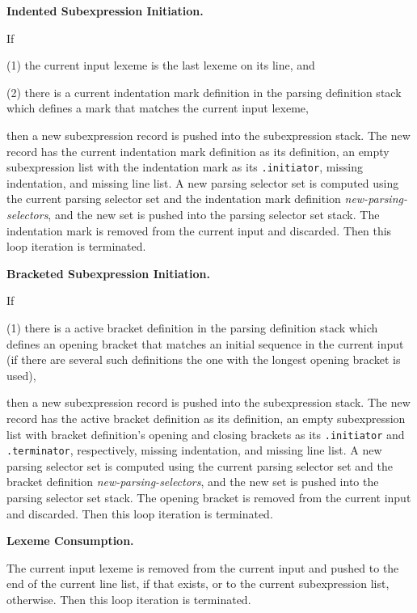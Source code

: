 \documentclass[12pt]{article}
\newenvironment{indpar}[1][0.3in]%
	{\begin{list}{}%
		     {\setlength{\itemsep}{0in}%
		      \setlength{\topsep}{0in}%
		      \setlength{\parsep}{1ex}%
		      \setlength{\labelwidth}{#1}%
		      \setlength{\leftmargin}{#1}%
		      \addtolength{\leftmargin}{\labelsep}}%
	 \item}%
	{\end{list}}
\begin{document}
\begin{indpar}
{\bf Indented Subexpression Initiation.}%
\begin{indpar}
If
\begin{list}{}
	     {\setlength{\itemsep}{0ex}%
	      \setlength{\topsep}{0ex}%
	      \setlength{\parsep}{0ex}%
	      \setlength{\leftmargin}{0.5in}%
	      \setlength{\rightmargin}{0.5in}}%
\item[(1)] the current input lexeme is the last lexeme on its line, and
\item[(2)] there is a current indentation mark definition in the
parsing definition stack which defines a mark that matches the
current input lexeme,
\end{list}
then a new subexpression record is pushed into the subexpression stack.
The new record has the current indentation mark definition as its
definition, an empty subexpression list with the indentation mark as
its {\tt .initiator}, missing indentation, and missing line list.
A new parsing selector set is computed using the current
parsing selector set and the indentation mark definition
{\em new-parsing-selectors}, and the new set is pushed into the
parsing selector set stack.
The indentation mark is removed from the current input and
discarded.
Then this loop iteration is terminated.
\end{indpar}

{\bf Bracketed Subexpression Initiation.}%
\begin{indpar}
If
\begin{list}{}
	     {\setlength{\itemsep}{0ex}%
	      \setlength{\topsep}{0ex}%
	      \setlength{\parsep}{0ex}%
	      \setlength{\leftmargin}{0.5in}%
	      \setlength{\rightmargin}{0.5in}}%
\item[(1)] there is a active bracket definition in the
parsing definition stack which defines an opening bracket that matches an
initial sequence in the current input
(if there are several such definitions the one with the longest
opening bracket is used),
\end{list}
then a new subexpression record is pushed into the subexpression stack.
The new record has the active bracket definition as its
definition, an empty subexpression list with bracket definition's
opening and closing brackets as its {\tt .initiator} and {\tt .terminator},
respectively, missing indentation, and missing line list.
A new parsing selector set is computed using the current
parsing selector set and the bracket definition
{\em new-parsing-selectors}, and the new set is pushed into the
parsing selector set stack.
The opening bracket is removed from the current input and
discarded.
Then this loop iteration is terminated.
\end{indpar}

{\bf Lexeme Consumption.}%
\begin{indpar}
The current input lexeme is removed from the current input and
pushed to the end of the current line list, if that exists, or to the
current subexpression list, otherwise.
Then this loop iteration is terminated.
\end{indpar}


\end{indpar}
\end{document}
